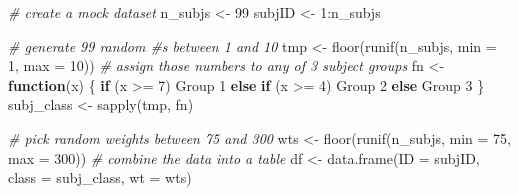 \documentclass[smallextended]{svjour3}       %
\newenvironment{Shaded}{\begin{snugshade}}{\end{snugshade}}
\newcommand{\AttributeTok}[1]{\textcolor[rgb]{0.77,0.63,0.00}{#1}}
\newcommand{\CommentTok}[1]{\textcolor[rgb]{0.56,0.35,0.01}{\textit{#1}}}
\newcommand{\ControlFlowTok}[1]{\textcolor[rgb]{0.13,0.29,0.53}{\textbf{#1}}}
\newcommand{\DecValTok}[1]{\textcolor[rgb]{0.00,0.00,0.81}{#1}}
\newcommand{\FunctionTok}[1]{\textcolor[rgb]{0.00,0.00,0.00}{#1}}
\newcommand{\NormalTok}[1]{#1}
\newcommand{\OtherTok}[1]{\textcolor[rgb]{0.56,0.35,0.01}{#1}}
\newcommand{\SpecialCharTok}[1]{\textcolor[rgb]{0.00,0.00,0.00}{#1}}
\newcommand{\StringTok}[1]{\textcolor[rgb]{0.31,0.60,0.02}{#1}}
\begin{document}
\begin{Shaded}
\begin{Highlighting}[]
\CommentTok{\# create a mock dataset}
\NormalTok{n\_subjs }\OtherTok{\textless{}{-}} \DecValTok{99}
\NormalTok{subjID }\OtherTok{\textless{}{-}} \DecValTok{1}\SpecialCharTok{:}\NormalTok{n\_subjs}

\CommentTok{\# generate 99 random \#s between 1 and 10}
\NormalTok{tmp }\OtherTok{\textless{}{-}} \FunctionTok{floor}\NormalTok{(}\FunctionTok{runif}\NormalTok{(n\_subjs, }\AttributeTok{min =} \DecValTok{1}\NormalTok{, }\AttributeTok{max =} \DecValTok{10}\NormalTok{))}
\CommentTok{\# assign those numbers to any of 3 subject groups}
\NormalTok{fn }\OtherTok{\textless{}{-}} \ControlFlowTok{function}\NormalTok{(x) \{ }
  \ControlFlowTok{if}\NormalTok{ (x }\SpecialCharTok{\textgreater{}=} \DecValTok{7}\NormalTok{) }\StringTok{\textquotesingle{}Group 1\textquotesingle{}} 
  \ControlFlowTok{else} \ControlFlowTok{if}\NormalTok{ (x }\SpecialCharTok{\textgreater{}=} \DecValTok{4}\NormalTok{) }\StringTok{\textquotesingle{}Group 2\textquotesingle{}} 
  \ControlFlowTok{else} \StringTok{\textquotesingle{}Group 3\textquotesingle{}} 
\NormalTok{\}}
\NormalTok{subj\_class }\OtherTok{\textless{}{-}} \FunctionTok{sapply}\NormalTok{(tmp, fn)}

\CommentTok{\# pick random weights between 75 and 300}
\NormalTok{wts }\OtherTok{\textless{}{-}} \FunctionTok{floor}\NormalTok{(}\FunctionTok{runif}\NormalTok{(n\_subjs, }\AttributeTok{min =} \DecValTok{75}\NormalTok{, }\AttributeTok{max =} \DecValTok{300}\NormalTok{))}
\CommentTok{\# combine the data into a table}
\NormalTok{df }\OtherTok{\textless{}{-}} \FunctionTok{data.frame}\NormalTok{(}\AttributeTok{ID =}\NormalTok{ subjID, }\AttributeTok{class =}\NormalTok{ subj\_class, }\AttributeTok{wt =}\NormalTok{ wts)}


\end{Highlighting}
\end{Shaded}
\end{document}
